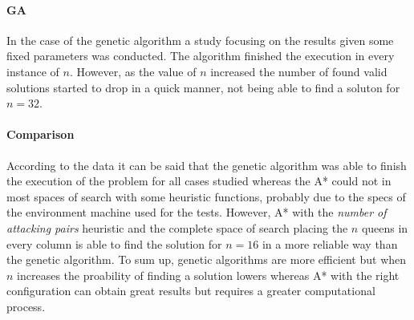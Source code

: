 \documentclass[]{llncs}
\begin{document}
\paragraph{GA}
In the case of the genetic algorithm a study focusing on the results given some fixed parameters was conducted. The algorithm finished the execution in every instance of $n$. However, as the value of $n$ increased the number of found valid solutions started to drop in a quick manner, not being able to find a soluton for $n = 32$. 

\paragraph{Comparison}
According to the data it can be said that the genetic algorithm was able to finish the execution of the problem for all cases studied whereas the A* could not in most spaces of search with some heuristic functions, probably due to the specs of the environment machine used for the tests. However, A* with the \textit{number of attacking pairs} heuristic and the complete space of search placing the $n$ queens in every column is able to find the solution for $n = 16$ in a more reliable way than the genetic algorithm. To sum up, genetic algorithms are more efficient but when $n$ increases the proability of finding a solution lowers whereas A* with the right configuration can obtain great results but requires a greater computational process.

\end{document}

